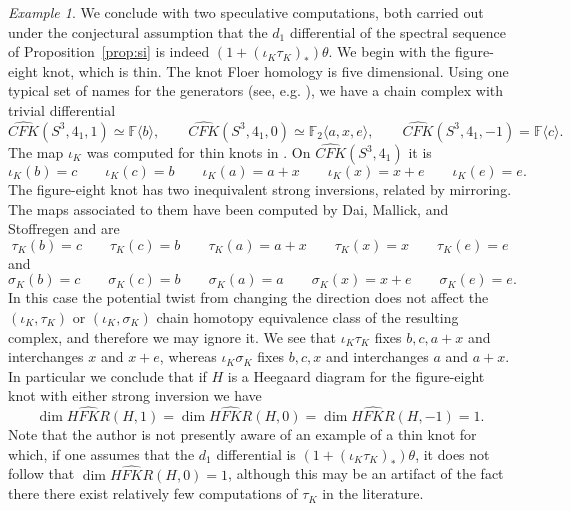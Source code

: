 \documentclass[11pt,reqno]{amsart}
\theoremstyle{definition}
\theoremstyle{remark}
\newtheorem{example}[thm]{Example}
\newcommand{\CFK}{\mathit{CFK}}
\newcommand\CFKhat{\widehat{\CFK}}
\newcommand \HFKR{ \widehat{\mathit{HFKR}}}
\numberwithin{equation}{section}
\begin{document}
\begin{example} We conclude with two speculative computations, both carried out under the conjectural assumption that the $d_1$ differential of the spectral sequence of Proposition~\ref{prop:si} is indeed $(1+(\iota_K\tau_K)_*)\theta$. We begin with the figure-eight knot, which is thin. The knot Floer homology is five dimensional. Using one typical set of names for the generators (see, e.g. \cite[Figure 5]{DMS:equivariant}), we have a chain complex with trivial differential \[\CFKhat(S^3,4_1,1) \simeq \mathbb F\langle b \rangle, \qquad \CFKhat(S^3,4_1,0) \simeq \mathbb F_2\langle a,x,e \rangle, \qquad  \CFKhat(S^3,4_1, -1) = \mathbb F \langle c\rangle.\]
%
The map $\iota_K$ was computed for thin knots in \cite[Section 8]{HMInvolutive}. On $\CFKhat(S^3,4_1)$ it is
%
\[ \iota_K(b) = c \qquad \iota_K(c)=b \qquad \iota_K(a) = a+x \qquad \iota_K(x) = x+e \qquad \iota_K(e)=e. \]
%
The figure-eight knot has two inequivalent strong inversions, related by mirroring. The maps associated to them have been computed by Dai, Mallick, and Stoffregen \cite[Example 2.26]{DMS:equivariant} and are
%
\[ \tau_K(b) = c \qquad \tau_K(c)=b \qquad \tau_K(a) = a+x \qquad \tau_K(x)=x \qquad \tau_K(e) = e \]
%
and
%
\[ \sigma_K(b) = c \qquad \sigma_K(c)=b \qquad \sigma_K(a) = a \qquad \sigma_K(x)=x+e \qquad \sigma_K(e) = e. \]
%
In this case the potential twist from changing the direction does not affect the $(\iota_K, \tau_K)$ or $(\iota_K, \sigma_K)$ chain homotopy equivalence class of the resulting complex, and therefore we may ignore it. We see that $\iota_K \tau_K$ fixes $b, c, a+x$ and interchanges $x$ and $x+e$, whereas $\iota_K \sigma_K$ fixes $b, c, x$ and interchanges $a$ and $a+x$. In particular we conclude that if $H$ is a Heegaard diagram for the figure-eight knot with either strong inversion we have
%
\[ \dim \HFKR(H, 1) = \dim \HFKR(H, 0) = \dim \HFKR (H, -1) =1. \]
%
Note that the author is not presently aware of an example of a thin knot for which, if one assumes that the $d_1$ differential is $(1+(\iota_K\tau_K)_*)\theta$, it does not follow that $\dim \HFKR(H, 0)=1$, although this may be an artifact of the fact there there exist relatively few computations of $\tau_K$ in the literature.


\end{example}
\end{document}
